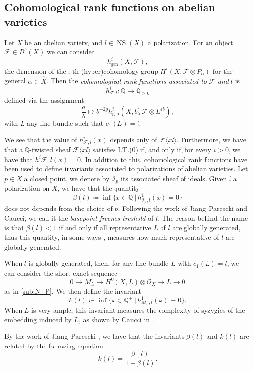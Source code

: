 \documentclass[11pt,letter]{amsart}
\numberwithin{equation}{section}
\begin{document}
\subsection{Cohomological rank functions on abelian varieties}\label{crf}

Let $X$ be an abelian variety, and $l\in\operatorname{NS}(X)$ a polarization. 
For an object $\mathcal{F}\in D^b(X)$  we can consider
$$
h^i_{\text{gen}}(X,\mathcal{F}),
$$
the dimension of the i-th (hyper)cohomology group $H^i(X,\mathcal{F}\otimes P_  \alpha)$ for the general $  \alpha\in\hat{X}$. Then the \emph{cohomological rank functions associated to $\mathcal{F}$ and $l$} is 
$$h^i_{\mathcal{F},l}:\mathbb{Q}\rightarrow\mathbb{Q}_{\ge 0}$$ defined via the assignment
$$\frac{a}{b}\mapsto b^{-2g}h^i_{\text{gen}}(X,b_X^*\mathcal{F}\otimes L^{ab}),$$
with $L$ any line bundle such that $c_1(L)=l$.\par
We see that the value of $h^i_{\mathcal{F},l}(x)$ depends only of $\mathcal{F}\langle xl\rangle$. Furthermore, we have that a $\mathbb{Q}$-twisted sheaf $\mathcal{F}\langle xl\rangle$ satisfies I.T.(0) if, and only if, for every $i>0$, we have that $h^i{\mathcal{F},l}(x)=0$. In addition to this, cohomological rank functions have been used to define invariants associated to polarizations of abelian varieties. Let $p\in X$ a closed point, we denote by $\mathcal{I}_p$ its associated sheaf of ideals. Given $l$ a polarization on $X$, we have that the quantity
\[\beta(l)\coloneqq\operatorname{inf}\{x\in\mathbb{Q}\:|\: h^1_{\mathcal{I}_p,l}(x)=0\}\]
does not depends from the choice of $p$. Following the work of Jiang--Pareschi and Caucci, we call it the \emph{basepoint-freenes treshold} of $l$. The reason behind the name is that $\beta(l)<1$ if and only if all representative $L$ of $l$
 are globally generated, thus this quantity, in some ways , measures how much representative of $l$ are globally generated.\par
 When $l$ is globally generated, then, for any line bundle $L$ with $c_1(L)=l$, we can consider the short exact sequence
 \begin{equation}\label{sesimportant}
     0\rightarrow M_L\longrightarrow H^0(X,L)\otimes\mathcal{O}_X\longrightarrow L\rightarrow 0
 \end{equation}
 as in \ref{sub:N_P}. We then define the invariant
 \[
 k(l)\coloneqq \inf\{x\in\mathbb{Q}^+\:|\: h^1_{M_L,l}(x)=0\}.
 \]
 When $L$ is very ample, this invariant measures the complexity of syzygies of the embedding induced by $L$, as shown by Caucci in \cite{Caucci}.\par
 By the work of Jiang--Pareschi \cite[Thm. D]{JiPa2020}, we have that the invariants $\beta(l)$ and $k(l)$ are related by the following equation
 \begin{equation}\label{eq:kappabeta}
     k(l)=\frac{\beta(l)}{1-\beta(l)}.
 \end{equation}
  
\end{document}
